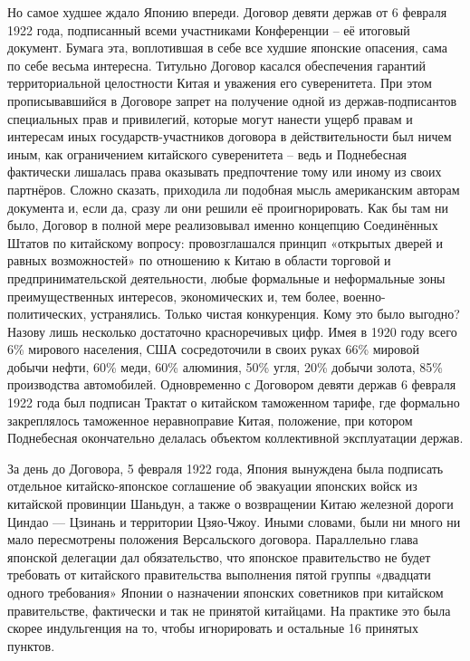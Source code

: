 Но самое худшее ждало Японию впереди. Договор девяти держав от 6 февраля 1922 года, подписанный всеми участниками Конференции – её итоговый документ. Бумага эта, воплотившая в себе все худшие японские опасения, сама по себе весьма интересна. Титульно Договор касался обеспечения гарантий территориальной целостности Китая и уважения его суверенитета. При этом прописывавшийся в Договоре запрет на получение одной из держав-подписантов специальных прав и привилегий, которые могут нанести ущерб правам и интересам иных государств-участников договора в действительности был ничем иным, как ограничением китайского суверенитета – ведь и Поднебесная фактически лишалась права оказывать предпочтение тому или иному из своих партнёров. Сложно сказать, приходила ли подобная мысль американским авторам документа и, если да, сразу ли они решили её проигнорировать. Как бы там ни было, Договор в полной мере реализовывал именно концепцию Соединённых Штатов по китайскому вопросу: провозглашался принцип «открытых дверей и равных возможностей» по отношению к Китаю в области торговой и предпринимательской деятельности, любые формальные и неформальные зоны преимущественных интересов, экономических и, тем более, военно-политических, устранялись. Только чистая конкуренция. Кому это было выгодно? Назову лишь несколько достаточно красноречивых цифр. Имея в 1920 году всего 6\% мирового населения, США сосредоточили в своих руках 66\% мировой добычи нефти, 60\% меди, 60\% алюминия, 50\% угля, 20\% добычи золота, 85\% производства автомобилей. Одновременно с Договором девяти держав 6 февраля 1922 года был подписан Трактат о китайском таможенном тарифе, где формально закреплялось таможенное неравноправие Китая, положение, при котором Поднебесная окончательно делалась объектом коллективной эксплуатации держав.

За день до Договора, 5 февраля 1922 года, Япония вынуждена была подписать отдельное китайско-японское соглашение об эвакуации японских войск из китайской провинции Шаньдун, а также о возвращении Китаю железной дороги Циндао — Цзинань и территории Цзяо-Чжоу. Иными словами, были ни много ни мало пересмотрены положения Версальского договора. Параллельно глава японской делегации дал обязательство, что японское правительство не будет требовать от китайского правительства выполнения пятой группы «двадцати одного требования» Японии о назначении японских советников при китайском правительстве, фактически и так не принятой китайцами. На практике это была скорее индульгенция на то, чтобы игнорировать и остальные 16 принятых пунктов.

